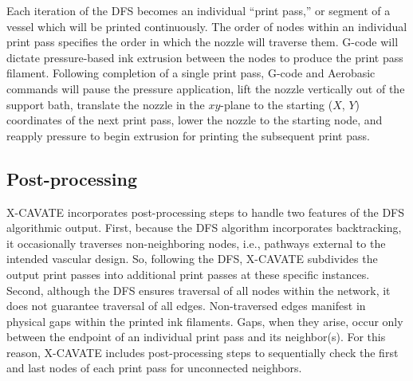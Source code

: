 \documentclass[11pt,letterpaper]{article}
\begin{document}
Each iteration of the DFS becomes an individual ``print pass,'' or segment of
a vessel which will be printed continuously. The order of nodes within an
individual print pass specifies the order in which the nozzle will traverse
them. G-code will dictate pressure-based ink extrusion between the nodes to
produce the print pass filament. Following completion of a single print pass,
G-code and Aerobasic commands will pause the pressure application, lift the
nozzle vertically out of the support bath, translate the nozzle in the
$xy$-plane to the starting ($X$, $Y$) coordinates of the next print pass,
lower the nozzle to the starting node, and reapply pressure to begin extrusion
for printing the subsequent print pass.

\subsection{Post-processing}

X-CAVATE incorporates post-processing steps to handle two features of the DFS
algorithmic output. First, because the DFS algorithm incorporates
backtracking, it occasionally traverses non-neighboring nodes, i.e., pathways
external to the intended vascular design. So, following the DFS, X-CAVATE
subdivides the output print passes into additional print passes at these
specific instances. Second, although the DFS ensures traversal of all
nodes within the network, it does not guarantee traversal of all edges.
Non-traversed edges manifest in physical gaps within the printed ink filaments.
Gaps, when they arise, occur only between the endpoint of an individual print
pass and its neighbor(s). For this reason, X-CAVATE includes post-processing
steps to sequentially check the first and last nodes of each print pass for
unconnected neighbors.
\end{document}
